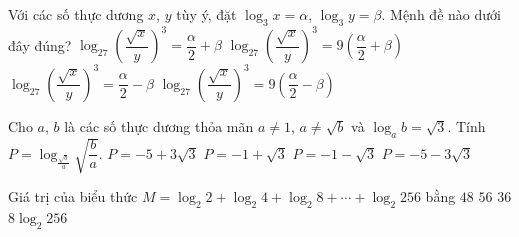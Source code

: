 \begin{ex}%
	Với các số thực  dương $x$, $y$ tùy ý, đặt $\log_3 x= \alpha$, $\log_3 y=\beta$. Mệnh đề nào dưới đây đúng?
	 \choice
		 {$\log_{27}\left(\dfrac{\sqrt{x}}{y}\right)^3=\dfrac{\alpha}{2}+\beta$}
		{$\log_{27}\left(\dfrac{\sqrt{x}}{y}\right)^3=9\left(\dfrac{\alpha}{2}+\beta\right)$} 
		{\True  $\log_{27}\left(\dfrac{\sqrt{x}}{y}\right)^3=\dfrac{\alpha}{2}-\beta$}
		{  $\log_{27}\left(\dfrac{\sqrt{x}}{y}\right)^3=9\left(\dfrac{\alpha}{2}-\beta\right)$}
\end{ex}

\begin{ex}%
	Cho $a$, $b$ là các số thực dương thỏa mãn  $a\neq 1$, $a\neq \sqrt{b}$ và $\log_a b=\sqrt{3}$. Tính $P=\log_{\frac{\sqrt{b}}{a}}\sqrt{\dfrac{b}{a}}$.
	\choice 
		 {$P=-5+3\sqrt{3}$}
		 {$P=-1+\sqrt{3}$}
		{\True $P=-1-\sqrt{3}$} 
		{$P=-5-3\sqrt{3}$} 
\end{ex}

\begin{ex}%
	Giá trị của biểu thức $M=\log_2 2+\log_2 4+\log_2  8+\cdots+\log_2 256$ bằng
	\choice 
		{$48$} 
		 {$56$}
		 {\True $36$}
		{$8\log_2 256$} 
\end{ex}

